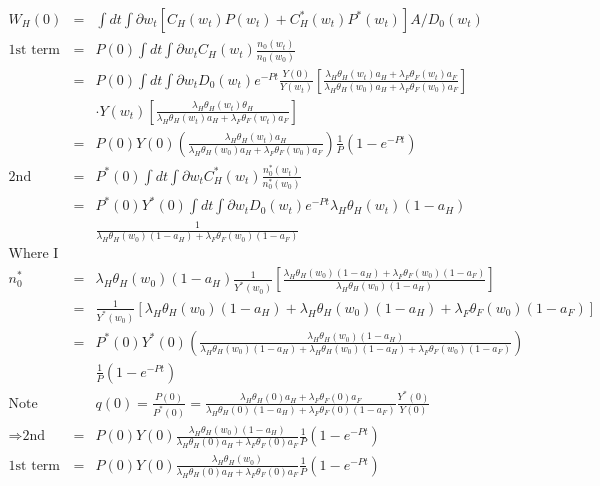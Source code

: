 \documentclass[]{article}
\begin{document}
\begin{eqnarray*}
W_H(0) &=& \int dt \int \partial w_t [C_H(w_t)P(w_t) + C_H^* (w_t) P^*(w_t)] A/D_0(w_t)\\
\mbox{1st term } &=& P(0) \int dt \int \partial w_t C_H(w_t) \frac{n_0(w_t)}{n_0(w_0)}\\
&=& P(0) \int dt \int \partial w_t D_0(w_t) e^{-Pt} \frac{Y(0)}{Y(w_t)} \left[\frac{\lambda_H \theta_H(w_t)a_H + \lambda_F \theta_F(w_t)a_F}{\lambda_H \theta_H(w_0)a_H + \lambda_F \theta_F (w_0) a_F}\right]\\
&& \cdot Y(w_t) \left[\frac{\lambda_H \theta_H(w_t)\theta_H}{\lambda_H \theta_H(w_t)a_H + \lambda_F \theta_F (w_t) a_F }\right]\\
&=& P(0) Y(0) \left(\frac{\lambda_H \theta_H(w_t)a_H}{\lambda_H \theta_H(w_0)a_H + \lambda_F \theta_F (w_0) a_F}\right) \frac{1}{P} (1-e^{-Pt})\\
\mbox{2nd term : } &=& P^*(0) \int dt \int \partial w_t C_H^*(w_t) \frac{n_0^*(w_t)}{n_0^*(w_0)}\\
&=& P^*(0) Y^*(0) \int dt \int \partial w_t D_0(w_t) e^{-Pt} \lambda_H \theta_H(w_t)(1-a_H)\\
&& \frac{1}{\lambda_H \theta_H(w_0)(1-a_H) + \lambda_F \theta_F (w_0) (1-a_F)}\\ 
\mbox{Where I have used,}&&\\
n^*_0 &=& \lambda_H \theta_H(w_0) (1-a_H) \frac{1}{Y^*(w_0)} \left[\frac{\lambda_H \theta_H(w_0)(1-a_H) + \lambda_F \theta_F (w_0) (1-a_F)}{\lambda_H \theta_H(w_0) (1-a_H)}\right]\\
&=& \frac{1}{Y^*(w_0)} [\lambda_H \theta_H(w_0)(1-a_H) + \lambda_H \theta_H (w_0) (1-a_H) + \lambda_F \theta_F(w_0)(1-a_F)]\\
&=& P^*(0) Y^*(0) \left(\frac{\lambda_H \theta_H(w_0)(1-a_H)}{\lambda_H \theta_H(w_0)(1-a_H) + \lambda_H \theta_H (w_0) (1-a_H) + \lambda_F \theta_F(w_0)(1-a_F)}\right)\\
&& \frac{1}{P} (1-e^{-Pt})\\
\mbox{Note from } && q(0) = \frac{P(0)}{P^*(0)} = \frac{\lambda_H \theta_H(0)a_H + \lambda_F \theta_F(0) a_F}{\lambda_H \theta_H(0)(1-a_H) + \lambda_F \theta_F(0) (1-a_F)} \frac{Y^*(0)}{Y(0)}\\
\Rightarrow \mbox{2nd term } &=& P(0) Y(0) \frac{\lambda_H \theta_H(w_0) (1-a_H)}{\lambda_H \theta_H(0)a_H + \lambda_F \theta_F(0) a_F} \frac{1}{P} (1-e^{-Pt})\\
\mbox{1st term + 2nd term } &=& P(0) Y(0) \frac{\lambda_H \theta_H(w_0)}{\lambda_H \theta_H(0) a_H + \lambda_F \theta_F(0) a_F} \frac{1}{P} (1-e^{-Pt})\\

\end{eqnarray*}
\end{document}
